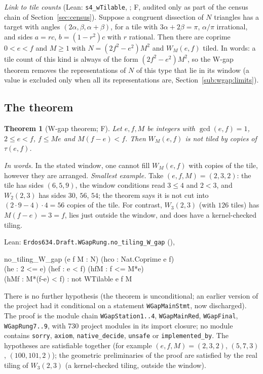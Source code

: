 \documentclass[11pt,reqno]{amsart}
\theoremstyle{plain}
\newtheorem{theorem}{Theorem}[section]
\theoremstyle{definition}
\newcommand{\sF}{\textup{\textsf{F}}}
\newcommand{\rec}[1]{\textup{\texttt{#1}}}
\begin{document}
\emph{Link to tile counts} (Lean: \rec{s4\_wTilable}, ; \sF, audited
only as part of the census chain of Section~\ref{sec:census}). Suppose a congruent dissection of $N$ triangles has a
target with angles $(2\alpha,\beta,\alpha+\beta)$, for a tile with $3\alpha+2\beta=\pi$, $\alpha/\pi$ irrational,
and sides $a=rc$, $b=(1-r^2)c$ with $r$ rational. Then there are coprime $0<e<f$ and $M\ge1$ with
$N=(2f^2-e^2)M^2$ and $W_M(e,f)$ tiled. In words: a tile count of this kind is always of the form
$(2f^2-e^2)M^2$, so the W-gap theorem removes the representations of $N$ of this type that lie in its window (a value is excluded only
when all its representations are, Section~\ref{sub:wgap:limits}).

\subsection{The theorem}\label{sub:wgap:thm}

\begin{theorem}[W-gap theorem; \sF]\label{thm:wgap}
Let $e,f,M$ be integers with $\gcd(e,f)=1$, $2\le e<f$, $f\le Me$ and $M(f-e)<f$. Then $W_M(e,f)$ is not tiled
by copies of $\tau(e,f)$.
\end{theorem}

\noindent\emph{In words.} In the stated window, one cannot fill $W_M(e,f)$ with copies of the tile, however they are
arranged. \emph{Smallest example.} Take $(e,f,M)=(2,3,2)$: the tile has sides $(6,5,9)$, the window conditions read $3\le4$
and $2<3$, and $W_2(2,3)$ has sides $30$, $56$, $54$; the theorem says it is not cut into $(2\cdot 9-4)\cdot 4=56$ copies of the tile.
For contrast, $W_3(2,3)$ (with $126$ tiles) has $M(f-e)=3=f$, lies just outside the window, and does have a
kernel-checked tiling.

\noindent Lean: \texttt{Erdos634.Draft.WGapRung.no\_tiling\_W\_gap}
(),
\begin{center}
\begin{minipage}{0.95\textwidth}\small\ttfamily no\_tiling\_W\_gap (e f M : N) (hco : Nat.Coprime e f)\\ (he : 2 <= e) (hef : e < f) (hfM : f <= M*e)\\ (hMf : M*(f-e) < f) : not WTilable e f M\end{minipage}
\end{center}
There is no further hypothesis (the theorem is unconditional; an earlier version of the project had it
conditional on a statement \rec{WGapMainStmt}, now discharged). The proof is the module chain
\texttt{WGapStation1..4}, \texttt{WGapMainRed}, \texttt{WGapFinal}, \texttt{WGapRung7..9}, with 730 project
modules in its import closure; no module contains \texttt{sorry}, \texttt{axiom}, \texttt{native\_decide},
\texttt{unsafe} or \texttt{implemented\_by}. The hypotheses are satisfiable together (for example
$(e,f,M)=(2,3,2)$, $(5,7,3)$, $(100,101,2)$); the geometric preliminaries of the proof are satisfied by the real
tiling of $W_3(2,3)$ (a kernel-checked tiling, outside the window).
\end{document}
